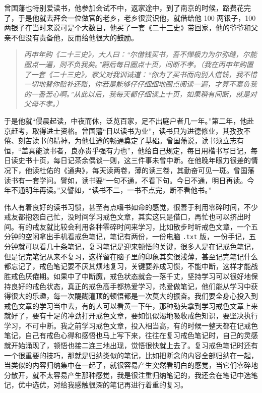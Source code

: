 曾国藩也特别爱读书，他参加会试不中，返家途中，到了南京的时候，路费花完了，于是他就去拜会一位做官的老乡，老乡很赏识他，就借给他 100 两银子，100 两银子在当时来说可是个大数目，他买了一套《二十三史》带回家，他的爷爷和父亲不但没有责备他，反而给他很大的鼓励。

\begin{quote}\it
    丙申年购《二十三史》，大人曰：“尔借钱买书，吾不惮极力为尔弥缝，尔能圈点一遍，则不负我矣。”嗣后每日圈点十页，间断不孝。（我在丙申年购置了一套《二十三史》，家父对我训诫道：“你为了买书而向别人借钱，我不惜一切地替你赔补还账，你若是能够仔仔细细地圈点阅读一遍，才算不辜负我的一番苦心啊。”从此以后，我每天都仔细读上十页，如果稍有间断，就是对父母不孝。）
\end{quote}

于是他就“侵晨起读，中夜而休，泛览百家，足不出庭户者几一年。”第二年，他赴京赶考，取得进士资格。曾国藩“日以读书为业”，读书只为进德修业，其孜孜不倦、刻苦读书的精神，为他仕途的畅通奠定了基础。曾国藩说，读书须立志有恒，“盖真能读书者，良亦贵乎强有力也”，他给自己规定，每日用楷书写日记，每日读史书十页，每日记茶余偶谈一则，这三件事未曾中断。在他晚年眼力很差的情况下，他读杜佑的《通典》，每天读两卷，薄的读三卷，其勤奋可见一斑。曾国藩读书有一套学问。譬如，读书要“一句不通，不看下句。今日不通，明日再读。今年不通明年再读。”又譬如，“读书不二，一书不点完，断不看他书。”

伟人有着良好的读书习惯，甚至有点嗜书如命的感觉，很善于利用零碎时间，不少戒友都抱怨自己忙，没时间学习戒色文章，其实这只是借口，再忙也可以挤出时间。有的戒友就比较会利用各种零碎时间来学习，比如散步时听戒色文章，一个五分钟的空闲拿出手机看戒色笔记，笔记有两份，一份电脑 \texttt{.txt} 版，一份手记，五分钟就可以看几十条笔记，复习笔记是迎来顿悟的关键，很多人是在记戒色笔记，但是记完笔记从来不复习，这样留在脑子里的印象其实很浅薄，甚至记完笔记什么都忘记了，戒色笔记要不厌其烦地复习，关键要养成习惯，不能中断，这样才能战胜戒色厌倦期。如果中了中断魔，戒色状态就会一落千丈，坚持学习可以很好地保持良好的戒色状态，真正的戒色高手都热爱学习，热爱做笔记，他们能从学习中获得很大的乐趣，每一次醍醐灌顶的顿悟都是一次莫大的振奋。我们要全身心投入到戒色文章的学习当中去，有的人可以看黄一下午，那种劲头拿到学习戒色文章上来就好了，要有十足的冲劲打开戒色文章，要如饥似渴地吸收戒色知识，要坚决执行学习，不可中断。我之前学习戒色文章，投入相当高，有的时候一整天都在记戒色笔记，自己有戒色心得和感悟也马上写下来，往往在复习戒色笔记时，自己的灵感就开始涌现了，顿悟也接二连三地出现，觉悟很快就上去了。复习戒色笔记时还有一个很重要的技巧，那就是归纳类似的笔记，比如把断念的内容全部归纳在一起，当类似的内容归纳集中在一起了，就很容易产生突然看明白的感觉，当它们零碎地分散开，就不太容易产生那种感觉，我是很注重归纳笔记的，我还会在笔记中选笔记，优中选优，对给我感触很深的笔记再进行着重的复习。

